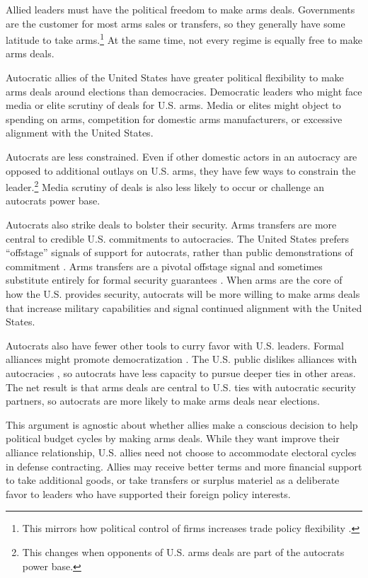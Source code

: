 \documentclass[12pt]{article}
\begin{document}
Allied leaders must have the political freedom to make arms deals.
Governments are the customer for most arms sales or transfers, so they generally have some latitude to take arms.\footnote{This mirrors how political control of firms increases trade policy flexibility \citep{Davisetal2019}.}
At the same time, not every regime is equally free to make arms deals. 


Autocratic allies of the United States have greater political flexibility to make arms deals around elections than democracies. 
Democratic leaders who might face media or elite scrutiny of deals for U.S. arms.
Media or elites might object to spending on arms, competition for domestic arms manufacturers, or excessive alignment with the United States.


Autocrats are less constrained.
Even if other domestic actors in an autocracy are opposed to additional outlays on U.S. arms, they have few ways to constrain the leader.\footnote{This changes when opponents of U.S. arms deals are part of the autocrats power base.}
Media scrutiny of deals is also less likely to occur or challenge an autocrats power base. 


Autocrats also strike deals to bolster their security.
Arms transfers are more central to credible U.S. commitments to autocracies.  
The United States prefers ``offstage'' signals of support for autocrats, rather than public demonstrations of commitment \citep{McManusYarhi-Milo2017}.
Arms transfers are a pivotal offstage signal and sometimes substitute entirely for formal security guarantees \citep{Yarhi-Miloetal2016}. 
When arms are the core of how the U.S. provides security, autocrats will be more willing to make arms deals that increase military capabilities and signal continued alignment with the United States.


Autocrats also have fewer other tools to curry favor with U.S. leaders.
Formal alliances might promote democratization \citep{GiblerWolford2006, Warren2016}.
The U.S. public dislikes alliances with autocracies \citep{Alley2022}, so autocrats have less capacity to pursue deeper ties in other areas. 
The net result is that arms deals are central to U.S. ties with autocratic security partners, so autocrats are more likely to make arms deals near elections. 


This argument is agnostic about whether allies make a conscious decision to help political budget cycles by making arms deals.
While they want improve their alliance relationship, U.S. allies need not choose to accommodate electoral cycles in defense contracting.
Allies may receive better terms and more financial support to take additional goods, or take transfers or surplus materiel as a deliberate favor to leaders who have supported their foreign policy interests. 
\end{document}
